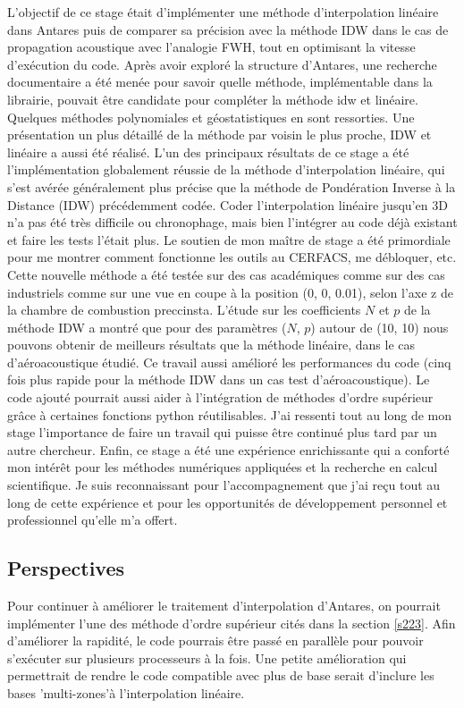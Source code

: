 L'objectif de ce stage était d'implémenter une méthode d'interpolation linéaire dans Antares puis de comparer sa précision avec la méthode IDW dans le cas de propagation acoustique avec l'analogie FWH, tout en optimisant la vitesse d'exécution du code.
Après avoir exploré la structure d'Antares, une recherche documentaire a été menée pour savoir quelle méthode, implémentable dans la librairie, pouvait être candidate pour compléter la méthode idw et linéaire. Quelques méthodes polynomiales et géostatistiques en sont ressorties. Une présentation un plus détaillé de la méthode par voisin le plus proche, IDW et linéaire a aussi été réalisé.
L'un des principaux résultats de ce stage a été l'implémentation globalement réussie de la méthode d'interpolation linéaire, qui s'est avérée généralement plus précise que la méthode de Pondération Inverse à la Distance (IDW) précédemment codée.
Coder l'interpolation linéaire jusqu'en 3D n'a pas été très difficile ou chronophage, mais bien l'intégrer au code déjà existant et faire les tests l'était plus. Le soutien de mon maître de stage a été primordiale pour me montrer comment fonctionne les outils au CERFACS, me débloquer, etc.
Cette nouvelle méthode a été testée sur des cas académiques comme sur des cas industriels comme sur une vue en coupe à la position (0, 0, 0.01), selon l'axe z de la chambre de combustion preccinsta.
L'étude sur les coefficients \(N\) et \(p\) de la méthode IDW a montré que pour des paramètres (\(N\), \(p\)) autour de (10, 10) nous pouvons obtenir de meilleurs résultats que la méthode linéaire, dans le cas d'aéroacoustique étudié.
Ce travail aussi amélioré les performances du code (cinq fois plus rapide pour la méthode IDW dans un cas test d'aéroacoustique).
Le code ajouté pourrait aussi aider à l'intégration de méthodes d'ordre supérieur grâce à certaines fonctions python réutilisables.
J'ai ressenti tout au long de mon stage l'importance de faire un travail qui puisse être continué plus tard par un autre chercheur.
Enfin, ce stage a été une expérience enrichissante qui a conforté mon intérêt pour les méthodes numériques appliquées et la recherche en calcul scientifique. Je suis reconnaissant pour l'accompagnement que j'ai reçu tout au long de cette expérience et pour les opportunités de développement personnel et professionnel qu'elle m'a offert.

\subsection*{Perspectives}
Pour continuer à améliorer le traitement d'interpolation d'Antares, on pourrait implémenter l'une des méthode d'ordre supérieur cités dans la section \ref{s223}.
Afin d'améliorer la rapidité, le code pourrais être passé en parallèle pour pouvoir s’exécuter sur plusieurs processeurs à la fois.
Une petite amélioration qui permettrait de rendre le code compatible avec plus de base serait d'inclure les bases 'multi-zones'à l'interpolation linéaire.


